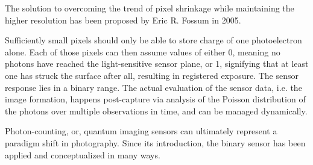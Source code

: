 The solution to overcoming the trend of pixel shrinkage while maintaining the higher resolution has been proposed by Eric R. Fossum in 2005.%

Sufficiently small pixels should only be able to store charge of one photoelectron alone.  Each of those pixels can then assume values of either 0, meaning no photons have reached the light-sensitive sensor plane, or 1, signifying that at least one has struck the surface after all, resulting in registered exposure. The sensor response lies in a binary range. The actual evaluation of the sensor data, i.e. the image formation, happens post-capture via analysis of the Poisson distribution of the photons over multiple observations in time, and can be managed dynamically. 

Photon-counting, or, quantum imaging sensors can ultimately represent a paradigm shift in photography. Since its introduction, the binary sensor has been applied and conceptualized in many ways.%

